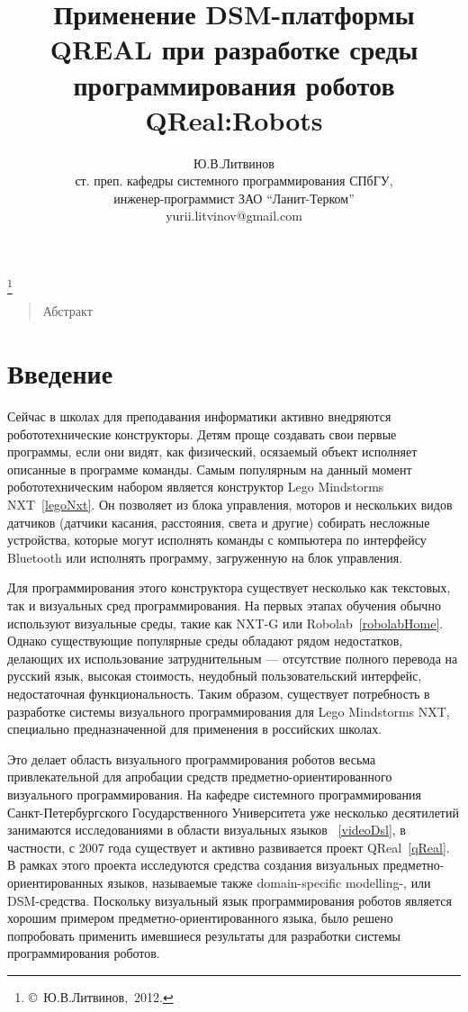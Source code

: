 \documentclass[a4paper]{article}
\title{Применение DSM-платформы QREAL при разработке среды программирования роботов QReal:Robots}
\author{Ю.В.Литвинов \\ ст. преп. кафедры системного программирования СПбГУ, \\ инженер-программист ЗАО ``Ланит-Терком'' \\ yurii.litvinov@gmail.com}
\date{}
\begin{document}
\maketitle
\thispagestyle{empty}

\renewcommand{\thefootnote}{}
\footnote{\small{\copyright~Ю.В.Литвинов,~2012.}}
\renewcommand{\thefootnote}{\arabic{footnote}}
\setcounter{footnote}{0}

\begin{quote}
\small\noindent
Абстракт
\end{quote}

\section*{Введение}
Сейчас в школах для преподавания информатики активно внедряются робототехнические конструкторы. Детям проще создавать свои первые программы, если они видят, как физический, осязаемый объект исполняет описанные в программе команды. Самым популярным на данный момент робототехническим набором является конструктор Lego Mindstorms NXT~\ref{legoNxt}. Он позволяет из блока управления, моторов и нескольких видов датчиков (датчики касания, расстояния, света и другие) собирать несложные устройства, которые могут исполнять команды с компьютера по интерфейсу Bluetooth или исполнять программу, загруженную на блок управления.

Для программирования этого конструктора существует несколько как текстовых, так и визуальных сред программирования. На первых этапах обучения обычно используют визуальные среды, такие как NXT-G или Robolab~\ref{robolabHome}. Однако существующие популярные среды обладают рядом недостатков, делающих их использование затруднительным --- отсутствие полного перевода на русский язык, высокая стоимость, неудобный пользовательский интерфейс, недостаточная функциональность. Таким образом, существует потребность в разработке системы визуального программирования для Lego Mindstorms NXT, специально предназначенной для применения в российских школах.

Это делает область визуального программирования роботов весьма привлекательной для апробации средств предметно-ориентированного визуального программирования. На кафедре системного программирования Санкт-Петербургского Государственного Университета уже несколько десятилетий занимаются исследованиями в области визуальных языков ~\ref{videoDsl}, в частности, с 2007 года существует и активно развивается проект QReal~\ref{qReal}. В рамках этого проекта исследуются средства создания визуальных предметно-ориентированных языков, называемые также domain-specific modelling-, или DSM-средства. Поскольку визуальный язык программирования роботов является хорошим примером предметно-ориентированного языка, было решено попробовать применить имевшиеся результаты для разработки системы программирования роботов. 
\end{document}
